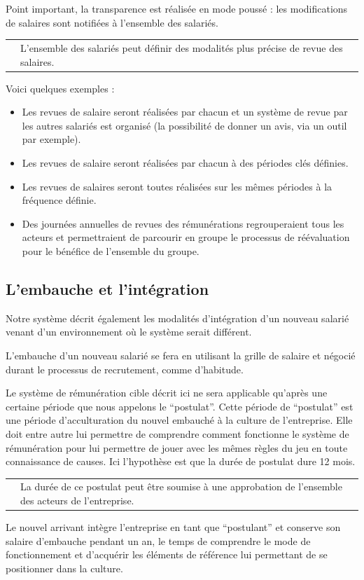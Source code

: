 \documentclass[12pt]{article}
\newcommand{\assemblee}[1]{%
  \begin{tcolorbox}[colframe=DarkPlum,boxrule=2pt,arc=4pt,left=6pt,right=6pt,top=6pt,bottom=6pt,boxsep=0pt,colback=white]
    \begin{tabular}{m{1cm} m{0.86\textwidth}}
      {\huge \faUsers} & #1 \\
    \end{tabular}
  \end{tcolorbox}
}
\begin{document}
 Point important, la transparence est réalisée en mode poussé : les modifications de salaires sont notifiées à l’ensemble des salariés. 

 \assemblee{L’ensemble des salariés peut définir des modalités plus précise de revue des salaires. }
 Voici quelques exemples :
 \begin{itemize}
   \item Les revues de salaire seront réalisées par chacun et un système de revue par les autres salariés est organisé (la possibilité de donner un avis, via un outil par exemple).
   \item Les revues de salaire seront réalisées par chacun à des périodes clés définies. 
   \item Les revues de salaires seront toutes réalisées sur les mêmes périodes à la fréquence définie.
   \item Des journées annuelles de revues des rémunérations regrouperaient tous les acteurs et permettraient de parcourir en groupe le processus de réévaluation pour le bénéfice de l'ensemble du groupe.
 \end{itemize}

\subsection{L’embauche et l’intégration}

 Notre système décrit également les modalités d’intégration d’un nouveau salarié venant d’un environnement où le système serait différent.

 L’embauche d’un nouveau salarié se fera en utilisant la grille de salaire et négocié durant le processus de recrutement, comme d’habitude. 

 Le système de rémunération cible décrit ici ne sera applicable qu’après une certaine période que nous appelons le “postulat”. Cette période de “postulat” est une période d’acculturation du nouvel embauché à la culture de l’entreprise. Elle doit entre autre lui permettre de comprendre comment fonctionne le système de rémunération pour lui permettre de jouer avec les mêmes règles du jeu en toute connaissance de causes. Ici l’hypothèse est que la durée de postulat dure 12 mois. 

 \assemblee{La durée de ce postulat peut être soumise à une approbation de l’ensemble des acteurs de l’entreprise.}

 Le nouvel arrivant intègre l’entreprise en tant que “postulant” et conserve son salaire d’embauche pendant un an, le temps de comprendre le mode de fonctionnement et d’acquérir les éléments de référence lui permettant de se positionner dans la culture.  
\end{document}
